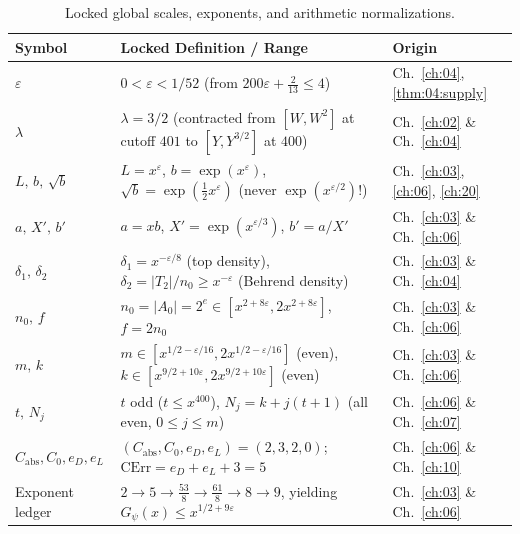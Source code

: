\begin{table}[ht]
\centering
\caption{Locked global scales, exponents, and arithmetic normalizations.}
\label{tab:00:constants}
\renewcommand{\arraystretch}{1.15}
\small
\begin{tabular}{@{}lll@{}}
\toprule
\textbf{Symbol} & \textbf{Locked Definition / Range} & \textbf{Origin} \\
\midrule
$\varepsilon$ & $0 < \varepsilon < 1/52$ (from $200\varepsilon + \frac{2}{13} \le 4$) & Ch.~\ref{ch:04}, \cref{thm:04:supply} \\
$\lambda$ & $\lambda = 3/2$ (contracted from $[W,W^2]$ at cutoff $401$ to $[Y,Y^{3/2}]$ at $400$) & Ch.~\ref{ch:02} \& Ch.~\ref{ch:04} \\
$L,\, b,\, \sqrt{b}$ & $L = x^\varepsilon$, $b = \exp(x^\varepsilon)$, $\sqrt{b} = \exp(\frac{1}{2}x^\varepsilon)$ (never $\exp(x^{\varepsilon/2})$!) & Ch.~\ref{ch:03}, \ref{ch:06}, \ref{ch:20} \\
$a,\, X',\, b'$ & $a = x b$, $X' = \exp(x^{\varepsilon/3})$, $b' = a/X'$ & Ch.~\ref{ch:03} \& Ch.~\ref{ch:06} \\
$\delta_1,\, \delta_2$ & $\delta_1 = x^{-\varepsilon/8}$ (top density), $\delta_2 = |T_2|/n_0 \ge x^{-\varepsilon}$ (Behrend density) & Ch.~\ref{ch:03} \& Ch.~\ref{ch:04} \\
$n_0,\, f$ & $n_0 = |A_0| = 2^e \in [x^{2+8\varepsilon}, 2x^{2+8\varepsilon}]$, $f = 2 n_0$ & Ch.~\ref{ch:03} \& Ch.~\ref{ch:06} \\
$m,\, k$ & $m \in [x^{1/2-\varepsilon/16}, 2x^{1/2-\varepsilon/16}]$ (even), $k \in [x^{9/2+10\varepsilon}, 2x^{9/2+10\varepsilon}]$ (even) & Ch.~\ref{ch:03} \& Ch.~\ref{ch:06} \\
$t,\, N_j$ & $t$ odd ($t \le x^{400}$), $N_j = k + j(t+1)$ (all even, $0 \le j \le m$) & Ch.~\ref{ch:06} \& Ch.~\ref{ch:07} \\
$C_{\mathrm{abs}}, C_0, e_D, e_L$ & $(C_{\mathrm{abs}}, C_0, e_D, e_L) = (2, 3, 2, 0)$; $\mathrm{CErr} = e_D + e_L + 3 = 5$ & Ch.~\ref{ch:06} \& Ch.~\ref{ch:10} \\
Exponent ledger & $2 \to 5 \to \frac{53}{8} \to \frac{61}{8} \to 8 \to 9$, yielding $G_\psi(x) \le x^{1/2 + 9\varepsilon}$ & Ch.~\ref{ch:03} \& Ch.~\ref{ch:06} \\
\bottomrule
\end{tabular}
\end{table}

